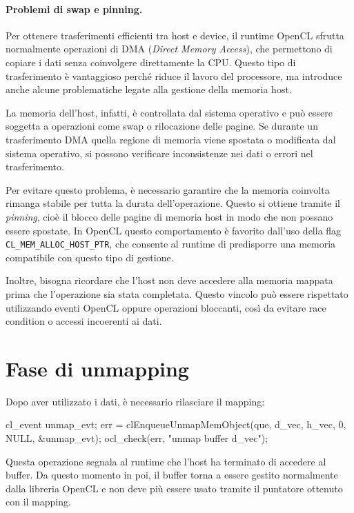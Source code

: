\paragraph{Problemi di swap e pinning.}
Per ottenere trasferimenti efficienti tra host e device, il runtime OpenCL sfrutta normalmente operazioni di DMA (\emph{Direct Memory Access}), che permettono di copiare i dati senza coinvolgere direttamente la CPU. Questo tipo di trasferimento è vantaggioso perché riduce il lavoro del processore, ma introduce anche alcune problematiche legate alla gestione della memoria host.

La memoria dell’host, infatti, è controllata dal sistema operativo e può essere soggetta a operazioni come swap o rilocazione delle pagine. Se durante un trasferimento DMA quella regione di memoria viene spostata o modificata dal sistema operativo, si possono verificare inconsistenze nei dati o errori nel trasferimento.

Per evitare questo problema, è necessario garantire che la memoria coinvolta rimanga stabile per tutta la durata dell’operazione. Questo si ottiene tramite il \emph{pinning}, cioè il blocco delle pagine di memoria host in modo che non possano essere spostate. In OpenCL questo comportamento è favorito dall’uso della flag \texttt{CL\_MEM\_ALLOC\_HOST\_PTR}, che consente al runtime di predisporre una memoria compatibile con questo tipo di gestione.

Inoltre, bisogna ricordare che l’host non deve accedere alla memoria mappata prima che l’operazione sia stata completata. Questo vincolo può essere rispettato utilizzando eventi OpenCL oppure operazioni bloccanti, così da evitare race condition o accessi incoerenti ai dati.

\section{Fase di unmapping}

Dopo aver utilizzato i dati, è necessario rilasciare il mapping:

\begin{code}[caption={Unmapping del buffer}, label={code:unmap}]
cl_event unmap_evt;
err = clEnqueueUnmapMemObject(que, d_vec, h_vec, 0, NULL, &unmap_evt);
ocl_check(err, "unmap buffer d_vec");
\end{code}

Questa operazione segnala al runtime che l’host ha terminato di accedere al buffer. Da questo momento in poi, il buffer torna a essere gestito normalmente dalla libreria OpenCL e non deve più essere usato tramite il puntatore ottenuto con il mapping.

